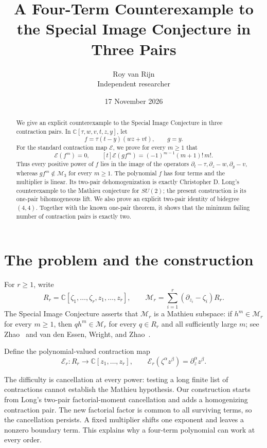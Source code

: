 \documentclass[11pt]{article}
\title{A Four-Term Counterexample to the Special Image Conjecture
  in Three Pairs}
\author{Roy van Rijn\\{\small Independent researcher}}
\date{17 November 2026}
\newcommand{\C}{\mathbb C}
\newcommand{\Eop}{\mathcal E}
\newcommand{\M}{\mathcal M}
\begin{document}
\maketitle

\begin{abstract}
We give an explicit counterexample to the Special Image Conjecture in
three contraction pairs.  In
\(\C[\tau,w,v,t,z,y]\), let
\[
 f=\tau(t-y)(wz+vt),\qquad g=y.
\]
For the standard contraction map \(\Eop\), we prove for every \(m\geq1\)
that
\[
 \Eop(f^m)=0,\qquad
 [t]\Eop(gf^m)=(-1)^{m-1}(m+1)!\,m!.
\]
Thus every positive power of \(f\) lies in the image of the operators
\(\partial_t-\tau,\partial_z-w,\partial_y-v\), whereas
\(gf^m\notin\M_3\) for every \(m\geq1\).  The polynomial \(f\) has
four terms and the multiplier is linear.  Its two-pair dehomogenization is
exactly Christopher D. Long's counterexample to the Mathieu conjecture for
\(SU(2)\); the present construction is its one-pair bihomogeneous lift.
We also prove an explicit two-pair identity of bidegree \((4,4)\).
Together with the known one-pair theorem, it shows that the minimum
failing number of contraction pairs is exactly two.
\end{abstract}

\section{The problem and the construction}

For \(r\geq1\), write
\[
 R_r=\C[\zeta_1,\ldots,\zeta_r,z_1,\ldots,z_r],
 \qquad
 \M_r=\sum_{i=1}^r(\partial_{z_i}-\zeta_i)R_r.
\]
The Special Image Conjecture asserts that \(\M_r\) is a Mathieu
subspace: if \(h^m\in\M_r\) for every \(m\geq1\), then
\(qh^m\in\M_r\) for every \(q\in R_r\) and all sufficiently large
\(m\); see Zhao~\cite{Zhao2010} and van den Essen, Wright, and
Zhao~\cite{EWZ2011}.

Define the polynomial-valued contraction map
\[
 \Eop_r:R_r\longrightarrow\C[z_1,\ldots,z_r],
 \qquad
 \Eop_r(\zeta^\alpha z^\beta)=\partial_z^\alpha z^\beta.
\]

The difficulty is cancellation at every power: testing a long finite list
of contractions cannot establish the Mathieu hypothesis. Our construction
starts from Long's two-pair factorial-moment cancellation and adds a
homogenizing contraction pair. The new factorial factor is common to all
surviving terms, so the cancellation persists. A fixed multiplier shifts
one exponent and leaves a nonzero boundary term. This explains why a
four-term polynomial can work at every order.
\end{document}
